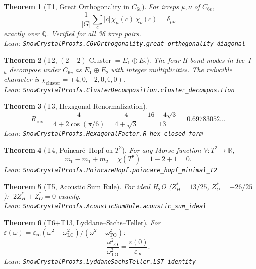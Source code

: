 \documentclass[11pt,a4paper]{article}
\newtheorem{theorem}{Theorem}
\begin{document}
\begin{theorem}[T1, Great Orthogonality in $C_{6v}$]\label{thm:T1}
For irreps $\mu,\nu$ of $C_{6v}$,
\[
\frac{1}{|G|} \sum_c |c|\, \chi_\mu(c)\, \chi_\nu(c) = \delta_{\mu\nu}
\]
exactly over $\mathbb{Q}$. Verified for all 36 irrep pairs.\\
{\small Lean: \texttt{SnowCrystalProofs.C6vOrthogonality.great\_orthogonality\_diagonal}}
\end{theorem}

\begin{theorem}[T2, $(2\!+\!2)$ Cluster $= E_1 \oplus E_2$]\label{thm:T2}
The four H-bond modes in Ice~I$_h$ decompose under $C_{6v}$ as $E_1 \oplus E_2$ with integer multiplicities. The reducible character is $\chi_\text{cluster} = (4,0,-2,0,0,0)$.\\
{\small Lean: \texttt{SnowCrystalProofs.ClusterDecomposition.cluster\_decomposition}}
\end{theorem}

\begin{theorem}[T3, Hexagonal Renormalization]\label{thm:T3}
\[
R_\text{hex} = \frac{4}{4+2\cos(\pi/6)} = \frac{4}{4+\sqrt{3}} = \frac{16-4\sqrt{3}}{13} = 0.69783052\ldots
\]
{\small Lean: \texttt{SnowCrystalProofs.HexagonalFactor.R\_hex\_closed\_form}}
\end{theorem}

\begin{theorem}[T4, Poincar\'e–Hopf on $T^2$]\label{thm:T4}
For any Morse function $V: T^2\to\mathbb{R}$,
\[
m_0 - m_1 + m_2 = \chi(T^2) = 1 - 2 + 1 = 0.
\]
{\small Lean: \texttt{SnowCrystalProofs.PoincareHopf.poincare\_hopf\_minimal\_T2}}
\end{theorem}

\begin{theorem}[T5, Acoustic Sum Rule]\label{thm:T5}
For ideal H$_2$O ($Z^*_H = 13/25$, $Z^*_O = -26/25$): $\;2 Z^*_H + Z^*_O = 0$ exactly.\\
{\small Lean: \texttt{SnowCrystalProofs.AcousticSumRule.acoustic\_sum\_ideal}}
\end{theorem}

\begin{theorem}[T6+T13, Lyddane–Sachs–Teller]\label{thm:T6}
For $\varepsilon(\omega) = \varepsilon_\infty (\omega^2-\omega_\text{LO}^2)/(\omega^2-\omega_\text{TO}^2)$:
\[
\frac{\omega_\text{LO}^2}{\omega_\text{TO}^2} = \frac{\varepsilon(0)}{\varepsilon_\infty}.
\]
{\small Lean: \texttt{SnowCrystalProofs.LyddaneSachsTeller.LST\_identity}}
\end{theorem}
\end{document}
